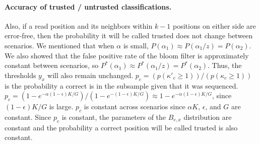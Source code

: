 \documentclass[10pt]{article}
\begin{document}

\paragraph{Accuracy of trusted / untrusted classifications.}
Also, if a read position and its neighbors within $k-1$ positions on either side are error-free, then the probability it will be called trusted does not change between scenarios.  We mentioned that when $\alpha$ is small, $P(\alpha_1) \approx P(\alpha_1/z) = P(\alpha_2)$.  We also showed that the false positive rate of the bloom filter is approximately constant between scenarios, so $P^*(\alpha_1) \approx P^*(\alpha_1/z) = P^*(\alpha_2)$.  Thus, the thresholds $y_x$ will also remain unchanged.
$p_c=(p(\kappa'_c\ge 1))/(p(\kappa_c\ge 1))$ is the probability a correct \kmer is in the subsample given that it was sequenced.
$p_c=(1-e^{-\alpha(1-\epsilon) K/G})/(1-e^{-(1-\epsilon) K/G})\approx 1-e^{-\alpha(1-\epsilon)K/G}$, since $(1-\epsilon)K/G$ is large.
$p_c$ is constant across scenarios since $\alpha K$, $\epsilon$, and $G$ are constant.
Since $p_c$ is constant, the parameters of the $B_{e,x}$ distribution are constant and the probability a correct position will be called trusted is also constant.
\end{document}
